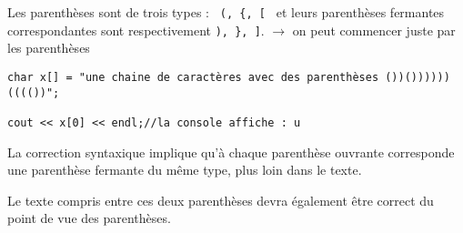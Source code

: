 \documentclass[french]{article}
\begin{document}
Les parenthèses sont de trois types : \texttt{ (, \{, [ } et leurs parenthèses fermantes correspondantes sont respectivement \texttt{), \}, ]}.
$\rightarrow$ on peut commencer juste par les parenthèses
\begin{lstlisting}[caption={Rappel : Déclaration d'une chaîne de caractères},label=stringrappel]
char x[] = "une chaine de caractères avec des parenthèses ())())))))(((())";

cout << x[0] << endl;//la console affiche : u
\end{lstlisting}

La correction syntaxique implique qu’à chaque parenthèse ouvrante corresponde une parenthèse fermante du même type, plus loin dans le texte.


Le texte compris entre ces deux parenthèses devra également être correct du point de vue des parenthèses.
\end{document}
